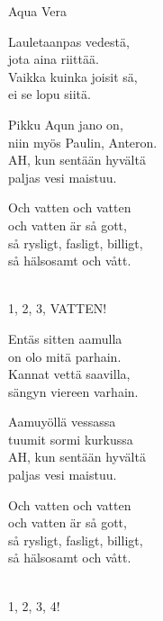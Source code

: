 \begin{song}{Aqua Vera}
	
	
	
	Lauletaanpas vedestä,\\
	jota aina riittää.\\
	Vaikka kuinka joisit sä,\\
	ei se lopu siitä.

	Pikku Aqun jano on,\\
	niin myös Paulin, Anteron.\\
	AH, kun sentään hyvältä\\
	paljas vesi maistuu.

	\begin{repetition}	
	Och vatten och vatten\\
	och vatten är så gott,\\
	så rysligt, fasligt, billigt,\\
	så hälsosamt och vått.
	\end{repetition}\\
	1, 2, 3, VATTEN!

	Entäs sitten aamulla\\
	on olo mitä parhain.\\
	Kannat vettä saavilla,\\
	sängyn viereen varhain.

	Aamuyöllä vessassa\\
	tuumit sormi kurkussa\\
	AH, kun sentään hyvältä\\
	paljas vesi maistuu.

	\begin{repetition}	
	Och vatten och vatten\\
	och vatten är så gott,\\
	så rysligt, fasligt, billigt,\\
	så hälsosamt och vått.
	\end{repetition}\\
	1, 2, 3, 4!

\end{song}
